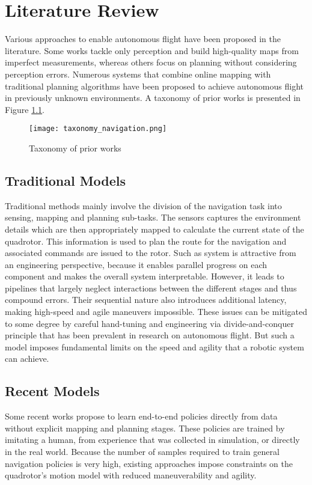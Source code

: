 \chapter{Literature Review} 
Various approaches to enable autonomous flight have been proposed in the literature. Some works tackle only perception and build high-quality maps from imperfect measurements, whereas others focus on planning without considering perception errors. Numerous systems that combine online mapping with traditional planning algorithms have been proposed to achieve autonomous flight in previously unknown environments. A taxonomy of prior works is presented in Figure \ref{fig:taxonomy}.

\begin{figure}[h]
	\begin{center}
		\texttt{[image: taxonomy\_navigation.png]}
		\caption{Taxonomy of prior works}
		\label{fig:taxonomy}
	\end{center}
\end{figure}

\section{Traditional Models}
Traditional methods mainly involve the division of the navigation task into sensing, mapping and planning sub-tasks. The sensors captures the environment details which are then appropriately mapped to calculate the current state of the quadrotor. This information is used to plan the route for the navigation and associated commands are issued to the rotor. Such as system is attractive from an engineering perspective, because it enables parallel progress on each component and makes the overall system interpretable. However, it leads to pipelines that largely neglect interactions between the different stages and thus compound errors. Their sequential nature also introduces additional latency, making high-speed and agile maneuvers impossible. These issues can be mitigated to some degree by careful hand-tuning and engineering via divide-and-conquer principle that has been prevalent in research on autonomous flight. But such a model imposes fundamental limits on the speed and agility that a robotic system can achieve. 

\section{Recent Models}
Some recent works propose to learn end-to-end policies directly from data without explicit mapping and planning stages. These policies are trained by imitating a human, from experience that was collected in simulation, or directly in the real world. Because the number of samples required to train general navigation policies is very high, existing approaches impose constraints on the quadrotor’s motion model with reduced maneuverability and agility. 

